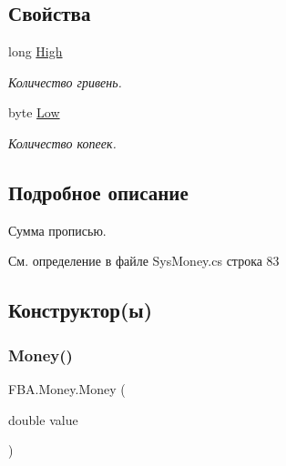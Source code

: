 \subsection*{Свойства}
\begin{DoxyCompactItemize}
\item 
long \mbox{\hyperlink{struct_f_b_a_1_1_money_a925b0bea7bd578bcc9d6b8af4c4306f9}{High}}
\begin{DoxyCompactList}\small\item\em Количество гривень. \end{DoxyCompactList}\item 
byte \mbox{\hyperlink{struct_f_b_a_1_1_money_a229ada74c4d0ae2a873e56669bfe4f98}{Low}}
\begin{DoxyCompactList}\small\item\em Количество копеек. \end{DoxyCompactList}\end{DoxyCompactItemize}


\subsection{Подробное описание}
Сумма прописью. 



См. определение в файле Sys\+Money.\+cs строка 83



\subsection{Конструктор(ы)}
\mbox{\label{struct_f_b_a_1_1_money_a72bac273f301e8fb0ff3d365ce1b3791}} 
\subsubsection{\texorpdfstring{Money()}{Money()}\hspace{0.1cm}{\footnotesize\ttfamily [1/2]}}
{\footnotesize\ttfamily F\+B\+A.\+Money.\+Money (\begin{DoxyParamCaption}\item[{double}]{value }\end{DoxyParamCaption})}



